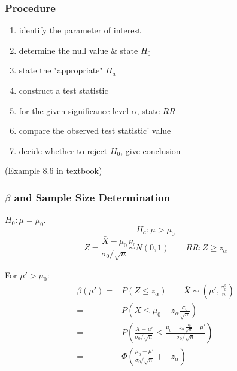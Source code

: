 \noindent{}

\subsubsection{Procedure}
\begin{enumerate}
\item identify the parameter of interest
\item determine the null value \& state $H_0$
\item state the "appropriate" $H_a$
\item construct a test statistic
\item for the given significance level $\alpha$, state $RR$
\item compare the observed test statistic' value
\item decide whether to reject $H_0$, give conclusion
\end{enumerate}

\begin{exmp}
(Example 8.6 in textbook)
\end{exmp}

\subsubsection{$\beta$ and Sample Size Determination}
$H_0:\mu=\mu_0$. 
\[H_a:\mu >\mu_0\]
\[Z=\frac{\bar{X}-\mu_0}{\sigma_0/\sqrt{n}}\overset{H_0}{\sim} N(0,1) \qquad RR: Z\geq z_{\alpha}\]

For $\mu'>\mu_0$: 
\begin{align*}
\beta(\mu')= & P(Z\leq z_{\alpha}) \qquad \bar{X}\sim \left(\mu',\frac{\sigma_0^2}{n}\right) \\
= & P\left(\bar{X}\leq \mu_0+z_{\alpha}\frac{\sigma_0}{\sqrt{n}}\right) \\
= & P\left( \frac{\bar{X}-\mu'}{\sigma_0/\sqrt{n}} \leq \frac{\mu_0+z_{\alpha} \frac{\sigma_0}{\sqrt{n}}-\mu'}	{\sigma_0/\sqrt{n} } \right) \\
= & \Phi\left( \frac{\mu_0-\mu'}	{\sigma_0/\sqrt{n} }++z_{\alpha}  \right)
\end{align*}

